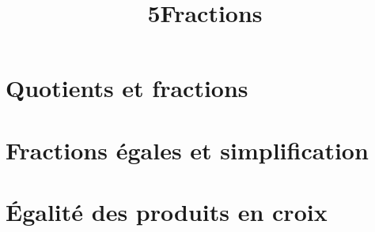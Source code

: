 \documentclass[12pt,a4paper]{article}
\date{}
\title{\textcircled{{\normalsize{5}}}Fractions}
\begin{document}
	\maketitle








\section{Quotients et fractions}



%
%

\section{Fractions égales et simplification}



\section{\'Egalité des produits en croix}


%

%
\end{document}

